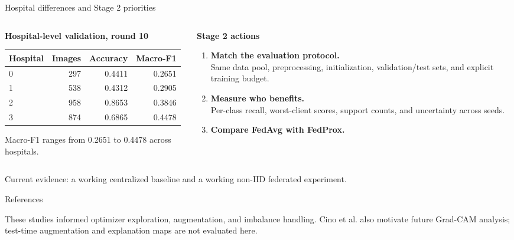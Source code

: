 \documentclass[aspectratio=169,11pt]{beamer}
\begin{document}
\begin{frame}{Hospital differences and Stage 2 priorities}
\begin{columns}[T]
\begin{column}{0.48\textwidth}
\textbf{Hospital-level validation, round 10}
\vspace{3mm}
\small
\setlength{\tabcolsep}{4pt}
\begin{tabular}{lrrr}
\toprule
Hospital & Images & Accuracy & Macro-F1\\
\midrule
0 & 297 & 0.4411 & 0.2651\\
1 & 538 & 0.4312 & 0.2905\\
2 & 958 & 0.8653 & 0.3846\\
3 & 874 & 0.6865 & 0.4478\\
\bottomrule
\end{tabular}
\vspace{4mm}
\small Macro-F1 ranges from \alert{0.2651 to 0.4478} across hospitals.
\end{column}
\begin{column}{0.49\textwidth}
\textbf{Stage 2 actions}
\small
\begin{enumerate}
\item \textbf{Match the evaluation protocol.}\\
Same data pool, preprocessing, initialization, validation/test sets, and explicit training budget.
\vspace{2mm}
\item \textbf{Measure who benefits.}\\
Per-class recall, worst-client scores, support counts, and uncertainty across seeds.
\vspace{2mm}
\item \textbf{Compare FedAvg with FedProx.}
\end{enumerate}
\end{column}
\end{columns}
\vspace{3mm}
\small Current evidence: a working centralized baseline and a working non-IID federated experiment.
\end{frame}

\begin{frame}{References}
\footnotesize
\begin{thebibliography}{3}

\end{thebibliography}
\vspace{3mm}
\scriptsize These studies informed optimizer exploration, augmentation, and imbalance handling. Cino et al. also motivate future Grad-CAM analysis; test-time augmentation and explanation maps are not evaluated here.
\end{frame}
\end{document}
